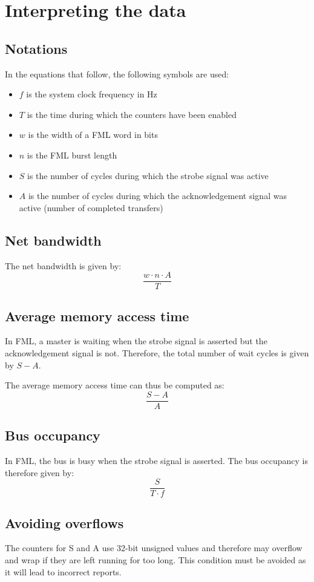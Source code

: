 \documentclass[a4paper,11pt]{article}
\begin{document}
\section{Interpreting the data}
\subsection{Notations}
In the equations that follow, the following symbols are used:
\begin{itemize}
\item $f$ is the system clock frequency in Hz
\item $T$ is the time during which the counters have been enabled
\item $w$ is the width of a FML word in bits
\item $n$ is the FML burst length
\item $S$ is the number of cycles during which the strobe signal was active
\item $A$ is the number of cycles during which the acknowledgement signal was active (number of completed transfers)
\end{itemize}

\subsection{Net bandwidth}
The net bandwidth is given by:
\[
\frac{w \cdot n \cdot A}{T}
\]

\subsection{Average memory access time}
In FML, a master is waiting when the strobe signal is asserted but the acknowledgement signal is not. Therefore, the total number of wait cycles is given by $S-A$.

The average memory access time can thus be computed as:
\[
\frac{S-A}{A}
\]

\subsection{Bus occupancy}
In FML, the bus is busy when the strobe signal is asserted. The bus occupancy is therefore given by:
\[
\frac{S}{T \cdot f}
\]

\subsection{Avoiding overflows}
The counters for S and A use 32-bit unsigned values and therefore may overflow and wrap if they are left running for too long. This condition must be avoided as it will lead to incorrect reports.
\end{document}
